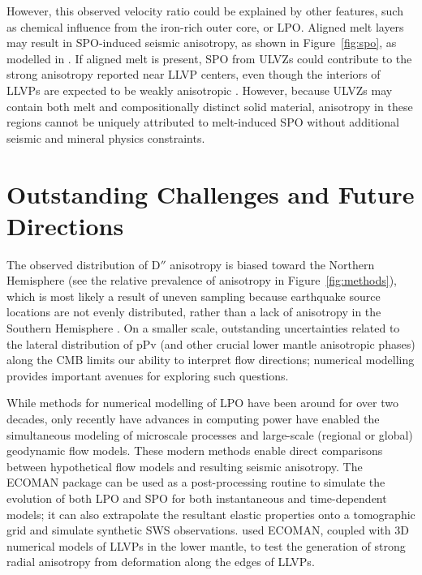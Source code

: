\documentclass{standard}
\begin{document}
However, this observed velocity ratio could be explained by other features, such as chemical influence from the iron-rich outer core, or LPO. Aligned melt layers may result in SPO-induced seismic anisotropy, as shown in Figure~\ref{fig:spo}, as modelled in \textcite{reissLowermostMantleAnisotropy2019}. If aligned melt is present, SPO from ULVZs could contribute to the strong anisotropy reported near LLVP centers, even though the interiors of LLVPs are expected to be weakly anisotropic \parencite{reissLowermostMantleAnisotropy2019,yuUltralowVelocityZone2018}. However, because ULVZs may contain both melt and compositionally distinct solid material, anisotropy in these regions cannot be uniquely attributed to melt-induced SPO without additional seismic and mineral physics constraints.

\section{Outstanding Challenges and Future Directions}

The observed distribution of D$''$ anisotropy is biased toward the Northern Hemisphere (see the relative prevalence of anisotropy in Figure~\ref{fig:methods}), which is most likely a result of uneven sampling because earthquake source locations are not evenly distributed, rather than a lack of anisotropy in the Southern Hemisphere \parencite{creasyConstrainingLowermostMantle2019}. On a smaller scale, outstanding uncertainties related to the lateral distribution of pPv (and other crucial lower mantle anisotropic phases) along the CMB limits our ability to interpret flow directions; numerical modelling provides important avenues for exploring such questions.

While methods for numerical modelling of LPO \parencite{kaminskiDRexProgramCalculation2004} have been around for over two decades, only recently have advances in computing power have enabled the simultaneous modeling of microscale processes and large-scale (regional or global) geodynamic flow models. These modern methods enable direct comparisons between hypothetical flow models and resulting seismic anisotropy. The ECOMAN package \parencite{faccendaECOMANOpensourcePackage2024} can be used as a post-processing routine to simulate the evolution of both LPO and SPO for both instantaneous and time-dependent models; it can also extrapolate the resultant elastic properties onto a tomographic grid and simulate synthetic SWS observations. \textcite{royLowermostMantleFlow2025} used ECOMAN, coupled with 3D numerical models of LLVPs in the lower mantle, to test the generation of strong radial anisotropy from deformation along the edges of LLVPs.
\end{document}
